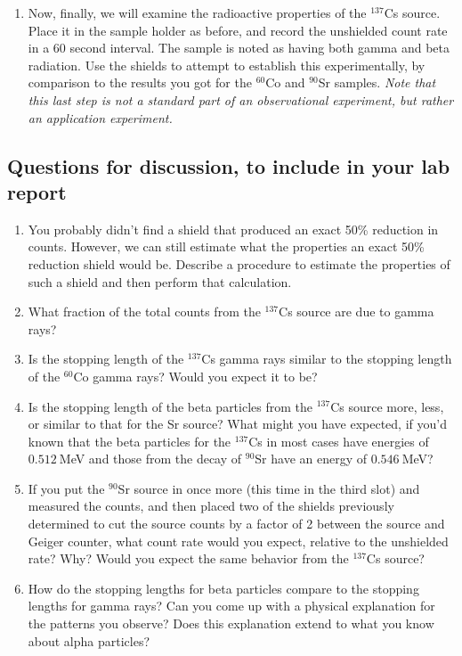 \begin{enumerate}
	\item Now, finally, we will examine the radioactive properties of the $^{137}$Cs source.
	Place it in the sample holder as before, and record the unshielded count rate in a 60 second interval.
	The sample is noted as having both gamma and beta radiation.
	Use the shields to attempt to establish this experimentally, by comparison to the results you got for the $^{60}$Co and $^{90}$Sr samples. \textit{Note that this last step is not a standard part of an observational experiment, but rather an application experiment.}
	
\end{enumerate}

\subsection{Questions for discussion, to include in your lab report}

\begin{enumerate}
	
	\item You probably didn't find a shield that produced an exact 50\% reduction in counts.
	However, we can still estimate what the properties an exact 50\% reduction shield would be. Describe a procedure to estimate the properties of such a shield and then perform that calculation.
	
	\item What fraction of the total counts from the $^{137}$Cs source are due to gamma rays?
	
	\item Is the stopping length of the $^{137}$Cs gamma rays similar to the stopping length of
	the $^{60}$Co gamma rays? Would you expect it to be?
	
	\item Is the stopping length of the beta particles from the $^{137}$Cs source more, less, or
	similar to that for the Sr source? What might you have expected, if you'd known
	that the beta particles for the $^{137}$Cs in most cases have energies of $0.512\:$MeV and
	those from the decay of $^{90}$Sr have an energy of $0.546\:$MeV?
	
	\item If you put the $^{90}$Sr source in once more (this time in the third slot) and measured
	the counts, and then placed two of the shields previously determined to cut the source counts by a factor of 2 between the source and Geiger counter, what count rate would you expect, relative to the unshielded rate?
	Why?
	Would you expect the same behavior from the $^{137}$Cs source?
	
	\item How do the stopping lengths for beta particles compare to the stopping lengths for gamma rays? Can you come up with a physical explanation for the patterns you observe? Does this explanation extend to what you know about alpha particles?
\end{enumerate}